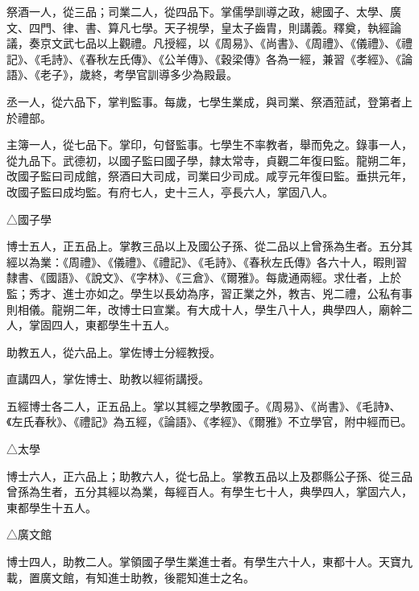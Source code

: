 \begin{pinyinscope}
 祭酒一人，從三品；司業二人，從四品下。掌儒學訓導之政，總國子、太學、廣文、四門、律、書、算凡七學。天子視學，皇太子齒胄，則講義。釋奠，執經論議，奏京文武七品以上觀禮。凡授經，以《周易》、《尚書》、《周禮》、《儀禮》、《禮記》、《毛詩》、《春秋左氏傳》、《公羊傳》、《穀梁傳》各為一經，兼習《孝經》、《論語》、《老子》，歲終，考學官訓導多少為殿最。



 丞一人，從六品下，掌判監事。每歲，七學生業成，與司業、祭酒蒞試，登第者上於禮部。



 主簿一人，從七品下。掌印，句督監事。七學生不率教者，舉而免之。錄事一人，從九品下。武德初，以國子監曰國子學，隸太常寺，貞觀二年復曰監。龍朔二年，改國子監曰司成館，祭酒曰大司成，司業曰少司成。咸亨元年復曰監。垂拱元年，改國子監曰成均監。有府七人，史十三人，亭長六人，掌固八人。



 △國子學



 博士五人，正五品上。掌教三品以上及國公子孫、從二品以上曾孫為生者。五分其經以為業：《周禮》、《儀禮》、《禮記》、《毛詩》、《春秋左氏傳》各六十人，暇則習隸書、《國語》、《說文》、《字林》、《三倉》、《爾雅》。每歲通兩經。求仕者，上於監；秀才、進士亦如之。學生以長幼為序，習正業之外，教吉、兇二禮，公私有事則相儀。龍朔二年，改博士曰宣業。有大成十人，學生八十人，典學四人，廟幹二人，掌固四人，東都學生十五人。



 助教五人，從六品上。掌佐博士分經教授。



 直講四人，掌佐博士、助教以經術講授。



 五經博士各二人，正五品上。掌以其經之學教國子。《周易》、《尚書》、《毛詩》、《左氏春秋》、《禮記》為五經，《論語》、《孝經》、《爾雅》不立學官，附中經而已。



 △太學



 博士六人，正六品上；助教六人，從七品上。掌教五品以上及郡縣公子孫、從三品曾孫為生者，五分其經以為業，每經百人。有學生七十人，典學四人，掌固六人，東都學生十五人。



 △廣文館



 博士四人，助教二人。掌領國子學生業進士者。有學生六十人，東都十人。天寶九載，置廣文館，有知進士助教，後罷知進士之名。




\end{pinyinscope}
